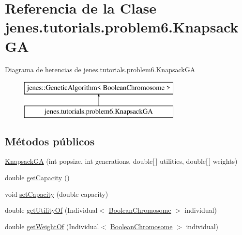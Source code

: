 \hypertarget{classjenes_1_1tutorials_1_1problem6_1_1_knapsack_g_a}{\section{Referencia de la Clase jenes.\-tutorials.\-problem6.\-Knapsack\-G\-A}
\label{classjenes_1_1tutorials_1_1problem6_1_1_knapsack_g_a}
}
Diagrama de herencias de jenes.\-tutorials.\-problem6.\-Knapsack\-G\-A\begin{figure}[H]
\begin{center}
\leavevmode
\includegraphics[height=2.000000cm]{classjenes_1_1tutorials_1_1problem6_1_1_knapsack_g_a}
\end{center}
\end{figure}
\subsection*{Métodos públicos}
\begin{DoxyCompactItemize}
\item 
\hyperlink{classjenes_1_1tutorials_1_1problem6_1_1_knapsack_g_a_aa9c826f237b43aa1cd061664c2f81f42}{Knapsack\-G\-A} (int popsize, int generations, double\mbox{[}$\,$\mbox{]} utilities, double\mbox{[}$\,$\mbox{]} weights)
\item 
double \hyperlink{classjenes_1_1tutorials_1_1problem6_1_1_knapsack_g_a_aa8e92fd2de8e1168d812074c0ebd19d1}{get\-Capacity} ()
\item 
void \hyperlink{classjenes_1_1tutorials_1_1problem6_1_1_knapsack_g_a_a6fd3b4ce9620189f4ef916a3616d7868}{set\-Capacity} (double capacity)
\item 
double \hyperlink{classjenes_1_1tutorials_1_1problem6_1_1_knapsack_g_a_a77be24cd9e25a9306562826f56113641}{get\-Utility\-Of} (Individual$<$ \hyperlink{classjenes_1_1chromosome_1_1_boolean_chromosome}{Boolean\-Chromosome} $>$ individual)
\item 
double \hyperlink{classjenes_1_1tutorials_1_1problem6_1_1_knapsack_g_a_ab3cf2a428b860020788cfbe381ed195f}{get\-Weight\-Of} (Individual$<$ \hyperlink{classjenes_1_1chromosome_1_1_boolean_chromosome}{Boolean\-Chromosome} $>$ individual)
\end{DoxyCompactItemize}


